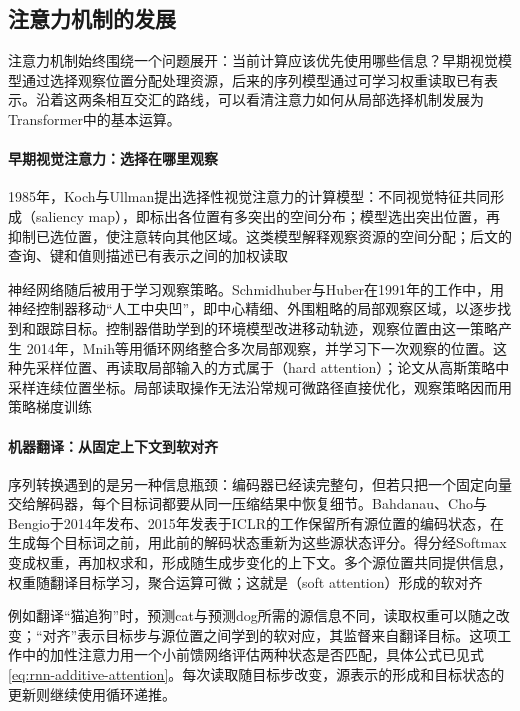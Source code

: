 \subsection{注意力机制的发展}
\label{sec:transformer-attention-history}

注意力机制始终围绕一个问题展开：当前计算应该优先使用哪些信息？早期视觉模型通过选择观察位置分配处理资源，后来的序列模型通过可学习权重读取已有表示。沿着这两条相互交汇的路线，可以看清注意力如何从局部选择机制发展为Transformer中的基本运算。

\paragraph{早期视觉注意力：选择在哪里观察}
1985年，Koch与Ullman提出选择性视觉注意力的计算模型：不同视觉特征共同形成（saliency map），即标出各位置有多突出的空间分布；模型选出突出位置，再抑制已选位置，使注意转向其他区域。这类模型解释观察资源的空间分配；后文的查询、键和值则描述已有表示之间的加权读取

神经网络随后被用于学习观察策略。Schmidhuber与Huber在1991年的工作中，用神经控制器移动“人工中央凹”，即中心精细、外围粗略的局部观察区域，以逐步找到和跟踪目标。控制器借助学到的环境模型改进移动轨迹，观察位置由这一策略产生 2014年，Mnih等用循环网络整合多次局部观察，并学习下一次观察的位置。这种先采样位置、再读取局部输入的方式属于（hard attention）；论文从高斯策略中采样连续位置坐标。局部读取操作无法沿常规可微路径直接优化，观察策略因而用策略梯度训练

\paragraph{机器翻译：从固定上下文到软对齐}
序列转换遇到的是另一种信息瓶颈：编码器已经读完整句，但若只把一个固定向量交给解码器，每个目标词都要从同一压缩结果中恢复细节。Bahdanau、Cho与Bengio于2014年发布、2015年发表于ICLR的工作保留所有源位置的编码状态，在生成每个目标词之前，用此前的解码状态重新为这些源状态评分。得分经Softmax变成权重，再加权求和，形成随生成步变化的上下文。多个源位置共同提供信息，权重随翻译目标学习，聚合运算可微；这就是（soft attention）形成的软对齐

例如翻译“猫追狗”时，预测cat与预测dog所需的源信息不同，读取权重可以随之改变；“对齐”表示目标步与源位置之间学到的软对应，其监督来自翻译目标。这项工作中的加性注意力用一个小前馈网络评估两种状态是否匹配，具体公式已见式\eqref{eq:rnn-additive-attention}。每次读取随目标步改变，源表示的形成和目标状态的更新则继续使用循环递推。

